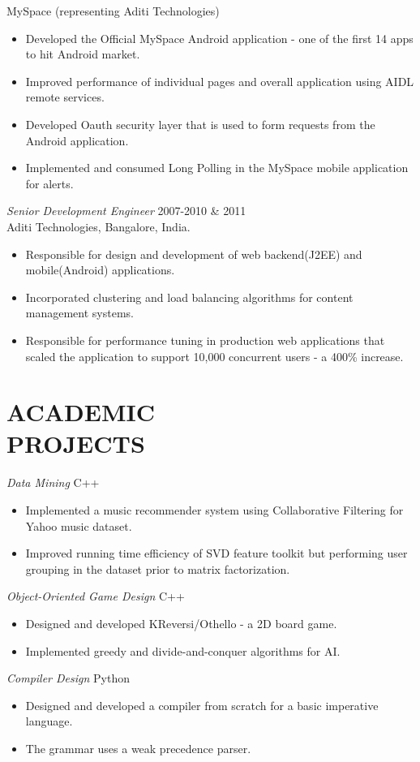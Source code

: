 \documentclass[line,margin]{res}
\begin{document}
\begin{resume}
		MySpace (representing Aditi Technologies) 
		\begin{itemize}  \itemsep -2pt %
			\item Developed the Official MySpace Android application - one of the first 14 apps to hit Android market.
			\item Improved performance of individual pages and overall application using AIDL
			remote services.
			\item Developed Oauth security layer that is used to form requests from the Android application. 
			\item Implemented and consumed Long Polling in the MySpace mobile application for alerts.
		\end{itemize} 
		{\sl Senior Development Engineer} \hfill        2007-2010 \& 2011 \\
		Aditi Technologies, Bangalore, India.
		\begin{itemize}     \itemsep -2pt
			\item Responsible for design and development of web backend(J2EE) and mobile(Android) applications.
			\item Incorporated clustering and load balancing algorithms for content management systems.
			\item Responsible for performance tuning in production web applications that scaled the application to support 10,000 concurrent users - a 400\% increase.
		\end{itemize} 
		
		
		\section{ACADEMIC \\ PROJECTS}  {\sl Data Mining} \hfill        C++
		\begin{itemize}  \itemsep -2pt %
			\item Implemented a music recommender system using Collaborative Filtering for Yahoo music dataset.
			\item Improved running time efficiency of SVD feature toolkit but performing user grouping in the dataset prior to matrix factorization.
		\end{itemize} 
		{\sl Object-Oriented Game Design}  \hfill        C++
		\begin{itemize} \itemsep -2pt
			\item Designed and developed KReversi/Othello - a 2D board game.
			\item Implemented greedy and divide-and-conquer algorithms for AI.
		\end{itemize} 
		{\sl Compiler Design}  \hfill        Python
		\begin{itemize} \itemsep -2pt
			\item Designed and developed a compiler from scratch for a basic imperative language.
			\item The grammar uses a weak precedence parser.       
		\end{itemize}
		

\end{resume}
\end{document}
